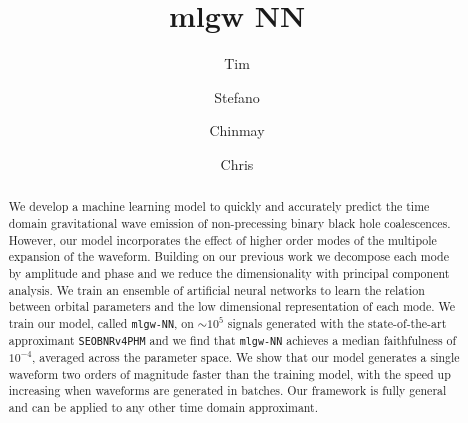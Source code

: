 \documentclass[twocolumn,showpacs,preprintnumbers,nofootinbib,prd,
superscriptaddress,10pt]{revtex4-1}
\begin{document}
\begin{abstract}

We develop a machine learning model to quickly and accurately predict the time domain gravitational wave emission 
of non-precessing binary black hole coalescences. However, our model incorporates the effect of higher order modes of the 
multipole expansion of the waveform. Building on our previous work \cite{Schmidt:2020yuu} we decompose each mode by 
amplitude and phase and we reduce the dimensionality with principal component analysis. We train an ensemble of 
artificial neural networks to learn the relation between orbital parameters and the low dimensional representation of 
each mode.
We train our model, called \texttt{mlgw-NN}, on $\sim 10^5$ signals generated with the state-of-the-art approximant 
\texttt{SEOBNRv4PHM} and we find that \texttt{mlgw-NN} achieves a median faithfulness of $10^{-4}$, averaged across the 
parameter space. We show that our model generates a single waveform two orders of magnitude faster than the training model, 
with the speed up increasing when waveforms are generated in batches.
Our framework is fully general and can be applied to any other time domain approximant.
\end{abstract}
	
	\title{mlgw NN}
	\author{Tim }
	\author{Stefano }
	\author{Chinmay }
	\author{Chris }
	\maketitle
\end{document}
